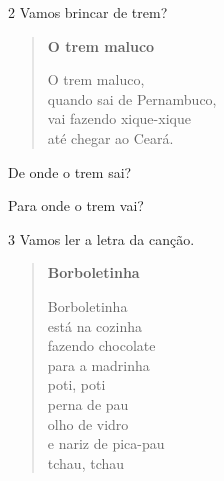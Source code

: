 \num{2} Vamos brincar de trem?


\begin{myquote}
\begin{verse}
\textbf{O trem maluco}

O trem maluco,\\
quando sai de Pernambuco,\\
vai fazendo xique-xique\\
até chegar ao Ceará.
\end{verse}
\end{myquote}

\begin{escolha}
\item De onde o trem sai?\\

\item Para onde o trem vai?\\
\end{escolha}

\num{3} Vamos ler a letra da canção.\enlargethispage{2\baselineskip}

\vspace{+1em}


\begin{myquote}
\begin{verse}
\textbf{Borboletinha}

Borboletinha\\
está na cozinha\\
fazendo chocolate\\
para a madrinha\\
poti, poti\\
perna de pau\\
olho de vidro\\
e nariz de pica-pau\\
tchau, tchau
\end{verse}

\end{myquote}

